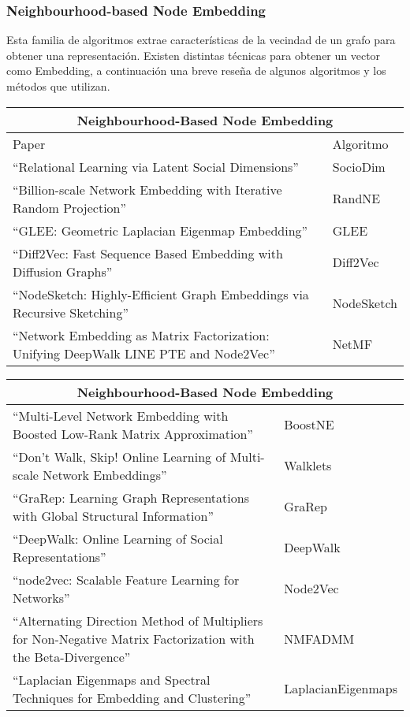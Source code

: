 \subsubsection{Neighbourhood-based Node Embedding}

Esta familia de algoritmos extrae características de la vecindad de un grafo para obtener una representación. Existen distintas técnicas para obtener un vector como Embedding, a continuación una breve reseña de algunos algoritmos y los métodos que utilizan.

\begin{center}
    \begin{tabular}{ |p{8cm}|p{2cm}|  }
    \hline
    \multicolumn{2}{|c|}{Neighbourhood-Based Node Embedding} \\
    \hline
    Paper & Algoritmo  \\
    \hline
    “Relational Learning via Latent Social Dimensions” & SocioDim \\
    \hline
    “Billion-scale Network Embedding with Iterative Random Projection” & RandNE \\
    \hline
    “GLEE: Geometric Laplacian Eigenmap Embedding” & GLEE \\
    \hline
    “Diff2Vec: Fast Sequence Based Embedding with Diffusion Graphs” & Diff2Vec \\
    \hline
    “NodeSketch: Highly-Efficient Graph Embeddings via Recursive Sketching” & NodeSketch \\
    \hline
    “Network Embedding as Matrix Factorization: Unifying DeepWalk LINE PTE and Node2Vec” & NetMF  \\
    \hline
    \end{tabular}
\end{center}

\begin{center}
    \begin{tabular}{ |p{8cm}|p{2cm}|  }
    \hline
    \multicolumn{2}{|c|}{Neighbourhood-Based Node Embedding} \\
    \hline
    “Multi-Level Network Embedding with Boosted Low-Rank Matrix Approximation” & BoostNE  \\
    \hline
    “Don’t Walk, Skip! Online Learning of Multi-scale Network Embeddings” & Walklets \\
    \hline
    “GraRep: Learning Graph Representations with Global Structural Information” & GraRep \\
    \hline
    “DeepWalk: Online Learning of Social Representations” & DeepWalk \\
    \hline
    “node2vec: Scalable Feature Learning for Networks” & Node2Vec \\
    \hline
    “Alternating Direction Method of Multipliers for Non-Negative Matrix Factorization with the Beta-Divergence” & NMFADMM \\
    \hline
    “Laplacian Eigenmaps and Spectral Techniques for Embedding and Clustering” & LaplacianEigenmaps \\
    \hline
    \end{tabular}
\end{center}



